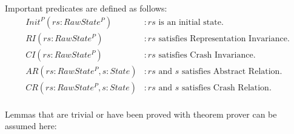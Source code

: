 \documentclass[a4paper,11pt]{article}
\theoremstyle{definition}
\begin{document}
Important predicates are defined as follows:
\begin{align*}
	\mathit{Init^P(rs : RawState^P)} &: \text{$\mathit{rs}$ is an initial state.}\\
	\mathit{RI(rs : RawState^P)} &: \text{$\mathit{rs}$ satisfies Representation Invariance.} \\
	\mathit{CI(rs : RawState^P)} &: \text{$\mathit{rs}$ satisfies Crash Invariance.} \\
	\mathit{AR(rs : RawState^P, s : State)} &: \text{$\mathit{rs}$ and $s$ satisfies Abstract Relation.} \\
	\mathit{CR(rs : RawState^P, s : State)} &: \text{$\mathit{rs}$ and $s$ satisfies Crash Relation.} \\
\end{align*}

Lemmas that are trivial or have been proved with theorem prover can be assumed here:
\end{document}

